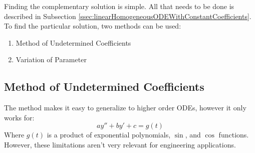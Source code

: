 \documentclass[12pt]{article}
\begin{document}
%
%
%

Finding the complementary solution is simple. All that needs to be done is described in Subsection \ref{ssec:linearHomogeneousODEWithConstantCoefficients}. To find the particular solution, two methods can be used:
\begin{enumerate}
  \itemsep0em
  \item Method of Undetermined Coefficients
  \item Variation of Parameter
\end{enumerate}

\newpage
\subsection{Method of Undetermined Coefficients}
\label{ssec:methodOfUndeterminedCoefficients}
The method makes it easy to generalize to higher order ODEs, however it only works for:
\begin{equation*}
  ay'' + by' + c = g(t)
\end{equation*}
Where $g(t)$ is a product of exponential polynomials, $\sin$, and $\cos$ functions. However, these limitations aren't very relevant for engineering applications.
\end{document}
